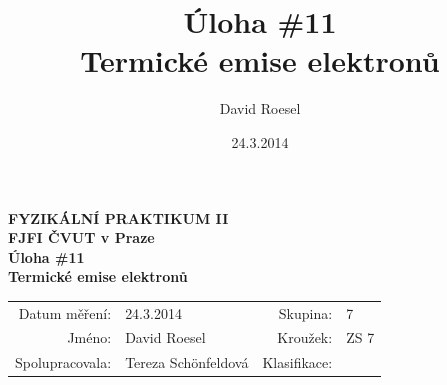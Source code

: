 \documentclass[english]{article}
\newcommand{\Author}{David Roesel}
\newcommand{\Coauthor}{Tereza Schönfeldová}
\newcommand{\Institute}{FJFI ČVUT v Praze}
\newcommand{\Subject}{FYZIKÁLNÍ PRAKTIKUM II}
\newcommand{\Group}{7}
\newcommand{\Circle}{ZS 7}
\newcommand{\Title}{Úloha \#11  \\Termické emise elektronů}
\newcommand{\Date}{24.3.2014}
\begin{document}
\author{\Author}
\title{\Title}
\date{\Date}

\renewcommand{\figurename}{Obr.}
\renewcommand{\tablename}{Tab.}
\renewcommand{\refname}{Reference}


\setlength{\parindent}{0cm}
\begin{multicols}{2}
\textbf{\Subject \\
        \Institute \\[0.1cm]
\Title \\[0.5cm]
}
\begin{tabular}{rlrl}
\large Datum měření: & \Date & \large Skupina: & \Group \\
\large Jméno: & \Author & \large Kroužek:  & \Circle\\
\large Spolupracovala: & \Coauthor &\large Klasifikace:\\
\end{tabular}


\end{multicols}
\end{document}
